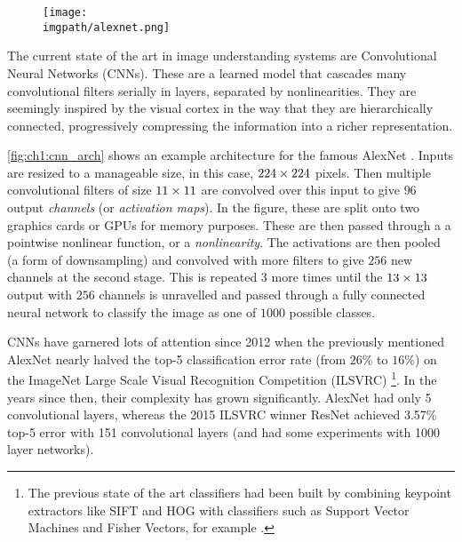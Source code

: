 \begin{figure}
  \centering
    \texttt{[image: \\imgpath/alexnet.png]}
    \label{fig:ch1:cnn_arch}
  \end{figure}
The current state of the art in image understanding systems are 
Convolutional Neural Networks (CNNs). These are a learned model that
cascades many convolutional filters serially in layers, separated by
nonlinearities. 
They are seemingly inspired by the visual cortex in the way that they are
hierarchically connected, progressively compressing the information into a
richer representation. 

\autoref{fig:ch1:cnn_arch} shows an example 
architecture for the famous AlexNet \cite{krizhevsky_imagenet_2012}. Inputs are resized to a
manageable size, in this case, $224\times 224$ pixels. Then multiple convolutional
filters of size $11\times 11$ are convolved over this input to give $96$ output
\emph{channels} (or \emph{activation maps}). In the figure, these are split onto two 
graphics cards or GPUs for memory purposes. These are then passed through a
a pointwise nonlinear function, or a \emph{nonlinearity}.
The activations are then pooled (a form of downsampling) and convolved with more
filters to give $256$ new channels at the second stage. This is repeated 3 more
times until the $13\times 13$ output with $256$ channels is unravelled and passed
through a fully connected neural network to classify the image as one of $1000$
possible classes.
  
CNNs have garnered lots of attention since 2012 when the previously mentioned AlexNet
nearly halved the top-5 classification error rate (from $26\%$ to $16\%$) 
on the ImageNet Large Scale Visual Recognition Competition (ILSVRC)
\cite{russakovsky_imagenet_2014}\footnote{The previous state of
the art classifiers had been built by combining keypoint extractors like 
SIFT\cite{lowe_distinctive_2004} and HOG\cite{dalal_histograms_2005} with
classifiers such as Support Vector Machines\cite{cortes_support-vector_1995} and
Fisher Vectors\cite{sanchez_image_2013}, for example \cite{sanchez_high-dimensional_2011}.}.
In the years since then, their complexity has grown significantly. AlexNet had
only 5 convolutional layers, whereas the 2015 ILSVRC winner ResNet \cite{he_deep_2016}
achieved 3.57\% top-5 error with 151 convolutional layers (and had some
experiments with 1000 layer networks).

